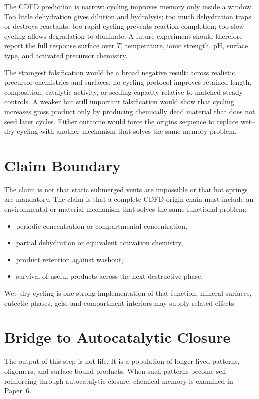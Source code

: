\documentclass[11pt,a4paper]{article}
\begin{document}
The CDFD prediction is narrow: cycling improves memory only inside a window. Too little dehydration gives dilution and hydrolysis; too much dehydration traps or destroys reactants; too rapid cycling prevents reaction completion; too slow cycling allows degradation to dominate. A future experiment should therefore report the full response surface over $T$, temperature, ionic strength, pH, surface type, and activated precursor chemistry.

The strongest falsification would be a broad negative result: across realistic
precursor chemistries and surfaces, no cycling protocol improves retained
length, composition, catalytic activity, or seeding capacity relative to matched
steady controls. A weaker but still important falsification would show that
cycling increases gross product only by producing chemically dead material that
does not seed later cycles. Either outcome would force the origins sequence to
replace wet--dry cycling with another mechanism that solves the same memory
problem.

\section{Claim Boundary}
The claim is not that static submerged vents are impossible or that hot springs are mandatory. The claim is that a complete CDFD origin chain must include an environmental or material mechanism that solves the same functional problem:
\begin{itemize}
 \item periodic concentration or compartmental concentration,
 \item partial dehydration or equivalent activation chemistry,
 \item product retention against washout,
 \item survival of useful products across the next destructive phase.
\end{itemize}
Wet--dry cycling is one strong implementation of that function; mineral surfaces, eutectic phases, gels, and compartment interiors may supply related effects.

\section{Bridge to Autocatalytic Closure}
The output of this step is not life. It is a population of longer-lived patterns, oligomers, and surface-bound products. When such patterns become self-reinforcing through autocatalytic closure, chemical memory is examined in Paper~6.
\end{document}
